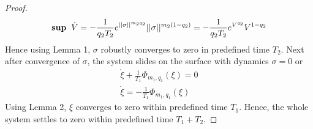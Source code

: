 \documentclass[]{article}
\theoremstyle{remark}
\theoremstyle{definition}
\begin{document}
\begin{proof}
\begin{align}
		\textbf{sup} \hspace{2mm} \dot V = -\frac{1}{q_2T_2}e^{||\sigma||^{m_2q_2}}||\sigma||^{m_2(1-q_2)}  = -\frac{1}{q_2T_2}e^{V^{q_2}}V^{1-q_2}
	\end{align}
Hence using Lemma 1, $\sigma$ robustly converges to zero in predefined time $T_2$. \newline
Next after convergence of $\sigma$, the system slides on the surface with dynamics $\sigma =0$ or 
\begin{align}
\dot{\xi} + \frac{1}{T_1}\Phi_{m_1,q_1}(\xi) = 0 \\
\dot{\xi}  = -\frac{1}{T_1}\Phi_{m_1,q_1}(\xi)
\end{align}
Using Lemma 2, $ \xi $ converges to zero within predefined time $T_1$. \newline
Hence, the whole system settles to zero within predefined time $ T_1+T_2 $. 
\end{proof}
\end{document}
